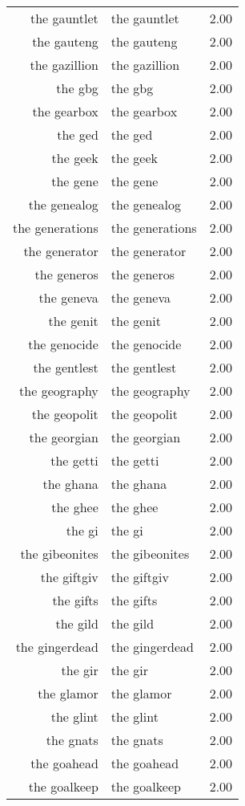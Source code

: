 \begin{table}[ht]
\begin{tabular}{rlr}
  the gauntlet & the gauntlet & 2.00 \\ 
  the gauteng & the gauteng & 2.00 \\ 
  the gazillion & the gazillion & 2.00 \\ 
  the gbg & the gbg & 2.00 \\ 
  the gearbox & the gearbox & 2.00 \\ 
  the ged & the ged & 2.00 \\ 
  the geek & the geek & 2.00 \\ 
  the gene & the gene & 2.00 \\ 
  the genealog & the genealog & 2.00 \\ 
  the generations & the generations & 2.00 \\ 
  the generator & the generator & 2.00 \\ 
  the generos & the generos & 2.00 \\ 
  the geneva & the geneva & 2.00 \\ 
  the genit & the genit & 2.00 \\ 
  the genocide & the genocide & 2.00 \\ 
  the gentlest & the gentlest & 2.00 \\ 
  the geography & the geography & 2.00 \\ 
  the geopolit & the geopolit & 2.00 \\ 
  the georgian & the georgian & 2.00 \\ 
  the getti & the getti & 2.00 \\ 
  the ghana & the ghana & 2.00 \\ 
  the ghee & the ghee & 2.00 \\ 
  the gi & the gi & 2.00 \\ 
  the gibeonites & the gibeonites & 2.00 \\ 
  the giftgiv & the giftgiv & 2.00 \\ 
  the gifts & the gifts & 2.00 \\ 
  the gild & the gild & 2.00 \\ 
  the gingerdead & the gingerdead & 2.00 \\ 
  the gir & the gir & 2.00 \\ 
  the glamor & the glamor & 2.00 \\ 
  the glint & the glint & 2.00 \\ 
  the gnats & the gnats & 2.00 \\ 
  the goahead & the goahead & 2.00 \\ 
  the goalkeep & the goalkeep & 2.00 \\ 

\end{tabular}
\end{table}
